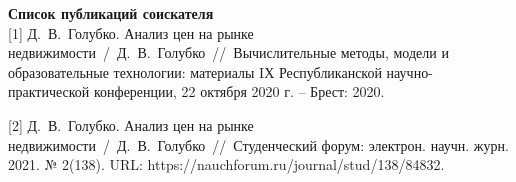 
\renewcommand{\bibsection}{\sectioncentered*{Cписок использованных источников}}
\pagebreak %

\nocite{*}



\newpage

\textbf{Список публикаций соискателя}\\

[1] Д.~В.~Голубко. Анализ цен на рынке недвижимости~/~Д.~В.~Голубко~//~Вычислительные методы, модели
и образовательные технологии: материалы IХ Республиканской научно-практической конференции, 22 октября 2020 г. -- Брест: 2020.

[2] Д.~В.~Голубко. Анализ цен на рынке недвижимости~/~Д.~В.~Голубко~//~Студенческий форум: электрон. научн. журн. 2021. № 2(138).\linebreak
URL: https://nauchforum.ru/journal/stud/138/84832.
\newpage
